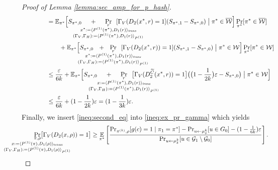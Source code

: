 \begin{proof}[Proof of Lemma \ref{lemma:sec_amp_for_p_hash}]
\begin{align}
%
&\IndII = \mathbb{E}_{\pi^*}\Bigl[ S_{\pi^*,0}
\mkern23mu + \mkern23mu
\underset{
  \mathclap{
  \substack{r \\ x^* := \langle P^{(1)}(\pi^*), D_1(r) \rangle_{\mathit{trans}}
    \\ (\Gamma_V, \Gamma_H) := \langle P^{(1)}(\pi^*), D_1 (r) \rangle_{P^{(1)}} }}}
{\Pr}\mkern13mu[\Gamma_V(D_2(x^*, r) = 1]
  (S_{\pi^*,1} - S_{\pi^*,0}) \bigm| \pi^* \in \overline{\cW}\Bigr] \Pr_{\pi^*}[\pi^* \in \overline{\cW}]\notag\\
&\IndIII +  \mathbb{E}_{\pi^*}\Bigl[ S_{\pi^*,0} \mkern13mu + \mkern13mu
\underset{
  \mathclap{
  \substack{r \\ x^* := \langle P^{(1)}(\pi^*), D_1(r) \rangle_{\mathit{trans}}
    \\ (\Gamma_V, \Gamma_H) := \langle P^{(1)}(\pi^*), D_1 (r) \rangle_{P^{(1)}} }}}
{\Pr}\mkern13mu[\Gamma_V(D_2(x^*, r)) = 1]
(S_{\pi^*,1} - S_{\pi^*,0})  \bigm| \pi^* \in \cW\Bigr] \Pr_{\pi^*}[\pi^* \in \cW] \notag\\
&\IndII \leq \frac{\epsilon}{6k} + \mathbb{E}_{\pi^*}\Bigl[ S_{\pi^*,0} \mkern23mu + \mkern23mu
\underset{
  \mathclap{
  \substack{r \\ x := \langle P^{(1)}(\pi^*), D_1(r) \rangle_{\mathit{trans}}
    \\ (\Gamma_V, \Gamma_H) := \langle P^{(1)}(\pi^*), D_1 (r) \rangle_{P^{(1)}} }}}
{\Pr}\mkern13mu\big[\Gamma_V(D_2^{\widetilde{C}}(x^*, r)) = 1\big]
\big(\bigl(1 - \frac{1}{2k}\bigr)\epsilon - S_{\pi^*,0}\big)  \bigm| \pi^* \in \cW \Bigr] \notag\\
&\IndII \leq \frac{\epsilon}{6k} + (1 - \frac{1}{2k})\epsilon = (1 - \frac{1}{3k}) \epsilon.
\end{align}
Finally, we insert \eqref{ineq:second_eq} into \eqref{ineq:ex_pr_gamma} which yields
\begin{align*}
  \IndI
\underset{
  \mathclap{
  \substack{\pi, \rho \\ x := \langle P^{(1)}(\pi), D_1(\rho) \rangle_{\text{trans}}
    \\ (\Gamma_V, \Gamma_H) := \langle P^{(1)}(\pi), D_1 (\rho) \rangle_{P^{(1)}} }}}
{\Pr}\big[\Gamma_V(D_2(x, \rho)) = 1\big]
&\geq \underset{\pi^*}{\mathbb{E}}\left[\frac{{\Pr}_{\pi^{(k)}, \rho}[g(c) = 1 \mid \pi_1 = \pi^*] -
{\Pr}_{u \leftarrow \mu_{\delta}^{k}}[u \in G_0] - (1 - \frac{1}{6k})\epsilon} {\Pr_{u \leftarrow \mu_{\delta}^{k}}[u \in \cG_1 \setminus \cG_0]}\right] \notag.
 \end{align*}

\end{proof}
